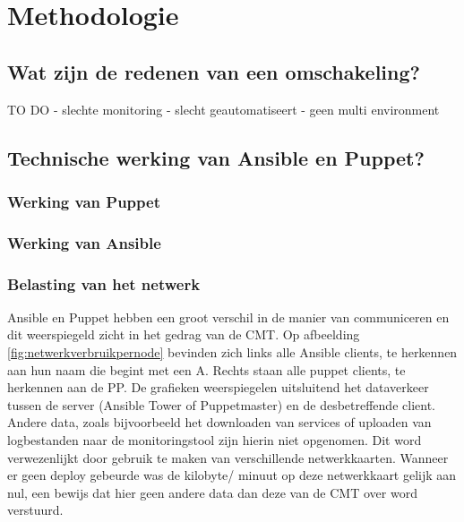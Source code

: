 
\chapter{Methodologie}
\label{ch:methodologie}


\section{Wat zijn de redenen van een omschakeling?}
\label{sec:methodologie-redenen-omschakeling}

TO DO
- slechte monitoring
- slecht geautomatiseert 
- geen multi environment

\section{Technische werking van Ansible en Puppet?}
\label{sec:methodologie-technische-verschillen}

\subsection{Werking van Puppet}

\subsection{Werking van Ansible}

\subsection{Belasting van het netwerk}

Ansible en Puppet hebben een groot verschil in de manier van communiceren en dit weerspiegeld zicht in het gedrag van de CMT. Op afbeelding \ref{fig:netwerkverbruikpernode} bevinden zich links alle Ansible clients, te herkennen aan hun naam die begint met een A. Rechts staan alle puppet clients, te herkennen aan de PP. De grafieken weerspiegelen uitsluitend het dataverkeer tussen de server (Ansible Tower of Puppetmaster) en de desbetreffende client. Andere data, zoals bijvoorbeeld het downloaden van services of uploaden van logbestanden naar de monitoringstool zijn hierin niet opgenomen. Dit word verwezenlijkt door gebruik te maken van verschillende netwerkkaarten. Wanneer er geen deploy gebeurde was de kilobyte/ minuut op deze netwerkkaart gelijk aan nul, een bewijs dat hier geen andere data dan deze van de CMT over word verstuurd.  \newline


